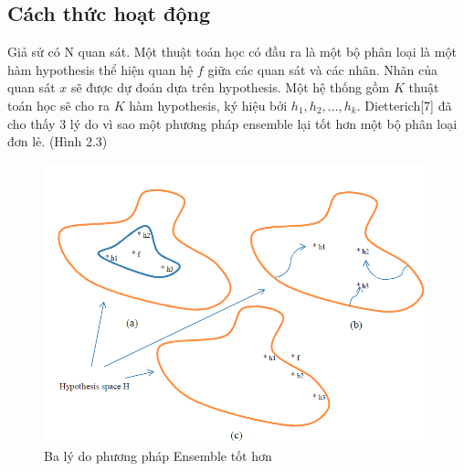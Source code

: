 \subsection{Cách thức hoạt động}
Giả sử có N quan sát. Một thuật toán học có đầu ra là một bộ phân loại là một hàm hypothesis thể hiện quan hệ $f$ giữa các quan sát và các nhãn. Nhãn của quan sát \textbf{$x$} sẽ được dự đoán dựa trên hypothesis. Một hệ thống gồm $K$ thuật toán học sẽ cho ra $K$ hàm hypothesis, ký hiệu bởi $h_1, h_2, ..., h_k$. Dietterich[7] đã cho thấy 3 lý do vì sao một phương pháp ensemble lại tốt hơn một bộ phân loại đơn lẻ. (Hình 2.3)
\begin{figure}[H]
    \centering
    \includegraphics[scale = 0.7]{Chapter2/Figs/hypothesis.PNG}
    
    \centering
    \caption{Ba lý do phương pháp Ensemble tốt hơn}
    \label{fig:my_label}
\end{figure}


